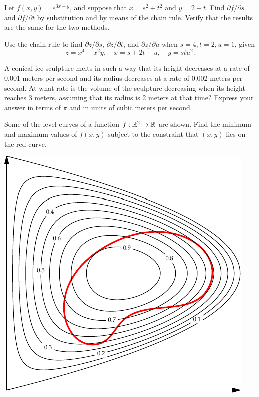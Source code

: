 \documentclass[svgnames]{watsonbook}
\begin{document}

\begin{aexercise}
  Let $f(x,y)=e^{3x+y}$, and suppose that $x=s^2+t^2$ and $y=2+t$. Find $\partial f/\partial s$ and $\partial f/\partial t$ by substitution and by means of the chain rule. Verify that the results are the same for the two methods. 
\end{aexercise}


\begin{aexercise}
  Use the chain rule to find $\partial z/\partial s$, $\partial
  z/\partial t$, and $\partial z/\partial u$ when $s=4, t = 2, u=1$, given 
  \[
    z = x^4 + x^2y, \quad x = s + 2t - u, \quad y = stu^2.
  \]
\end{aexercise}

\begin{aexercise}
  A conical ice sculpture melts in such a way that its height decreases at a rate of 0.001 meters per second and its radius decreases at a rate of 0.002 meters per second. At what rate is the volume of the sculpture decreasing when its height reaches 3 meters, assuming that its radius is 2 meters at that time? Express your answer in terms of $\pi$ and  in units of cubic meters per second. 
\end{aexercise}


\begin{aexercise}
  Some of the level curves of a function $f: \mathbb{R}^2 \to \mathbb{R}$ are
  shown. Find the minimum and maximum values of $f(x,y)$ subject to
  the constraint that $(x,y)$ lies on the red curve.
  \begin{center}
    \includegraphics{exercisefigures/lagrange_exercise} 
  \end{center}
\end{aexercise}
\end{document}
